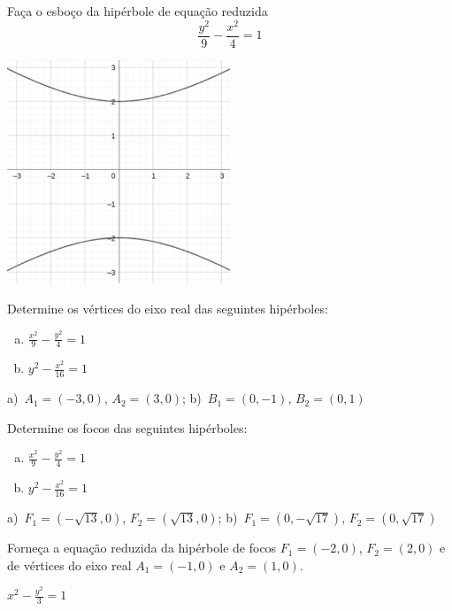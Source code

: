 \begin{exeresol}
  Faça o esboço da hipérbole de equação reduzida
  \begin{equation}
    \frac{y^2}{9} - \frac{x^2}{4} = 1
  \end{equation}
\end{exeresol}
\begin{resp}
  \includegraphics[width=0.5\textwidth]{cap_conicas/dados/fig_hiperbole_exer_oy/fig}
\end{resp}

\begin{exer}
  Determine os vértices do eixo real das seguintes hipérboles:
  \begin{enumerate}[a)]
  \item $\displaystyle \frac{x^2}{9} - \frac{y^2}{4} = 1$
  \item $\displaystyle y^2 - \frac{x^2}{16} = 1$
  \end{enumerate}
\end{exer}
\begin{resp}
  a)~$A_1=(-3,0)$, $A_2=(3,0)$; b)~$B_1=(0, -1)$, $B_2=(0, 1)$
\end{resp}

\begin{exer}
  Determine os focos das seguintes hipérboles:
  \begin{enumerate}[a)]
  \item $\displaystyle \frac{x^2}{9} - \frac{y^2}{4} = 1$
  \item $\displaystyle y^2 - \frac{x^2}{16} = 1$
  \end{enumerate}
\end{exer}
\begin{resp}
  a)~$F_1=(-\sqrt{13}, 0)$, $F_2=(\sqrt{13}, 0)$; b)~$F_1=(0, -\sqrt{17})$, $F_2=(0, \sqrt{17})$
\end{resp}

\begin{exer}
  Forneça a equação reduzida da hipérbole de focos $F_1=(-2, 0)$, $F_2=(2, 0)$ e de vértices do eixo real $A_1=(-1, 0)$ e $A_2=(1, 0)$.
\end{exer}
\begin{resp}
  $\displaystyle x^2 - \frac{y^2}{3} = 1$
\end{resp}

